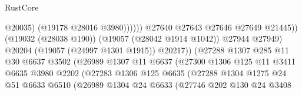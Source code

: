 \begin{lexlean}{RustCore}
\begin{coremodule}
                                                        @20035)
                                                      (@19178 @28016 @3980))))))
                                            @27640
                                            @27643
                                            @27646
                                            @27649
                                            @21445))
                                        (@19032 (@28038 @190))
                                        (@19057 (@28042 @1914 @1042))
                                        @27944
                                        @27949)
                                      @20204
                                      (@19057 (@24997 @1301 @1915))
                                      @20217))
                                  (@27288
                                    @1307
                                    @285
                                    @11
                                    @30
                                    @6637
                                    @3502
                                    (@26989
                                      @1307
                                      @11
                                      @6637
                                      (@27300
                                        @1306
                                        @125
                                        @11
                                        @3411
                                        @6635
                                        @3980
                                        @2202
                                        (@27283
                                          @1306
                                          @125
                                          @6635
                                          (@27288
                                            @1304
                                            @1275
                                            @24
                                            @51
                                            @6633
                                            @6510
                                            (@26989
                                              @1304
                                              @24
                                              @6633
                                              (@27746
                                                @202
                                                @130
                                                @24
                                                @3408

\end{coremodule}
\end{lexlean}
